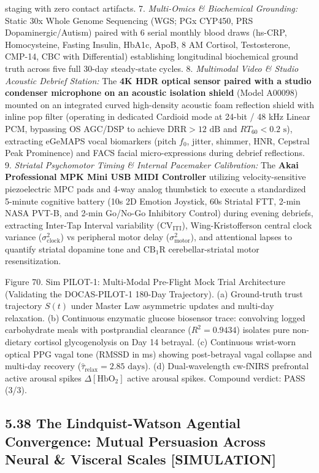 \documentclass[
]{article}
\begin{document}
staging with zero contact artifacts. 7. \emph{Multi-Omics \& Biochemical
Grounding:} Static 30x Whole Genome Sequencing (WGS; PGx CYP450, PRS
Dopaminergic/Autism) paired with 6 serial monthly blood draws (hs-CRP,
Homocysteine, Fasting Insulin, HbA1c, ApoB, 8 AM Cortisol, Testosterone,
CMP-14, CBC with Differential) establishing longitudinal biochemical
ground truth across five full 30-day steady-state cycles. 8.
\emph{Multimodal Video \& Studio Acoustic Debrief Station:} The
\textbf{4K HDR optical sensor paired with a studio condenser microphone
on an acoustic isolation shield} (Model A00098) mounted on an integrated
curved high-density acoustic foam reflection shield with inline pop
filter (operating in dedicated Cardioid mode at 24-bit / 48 kHz Linear
PCM, bypassing OS AGC/DSP to achieve \(\text{DRR} > 12\text{ dB}\) and
\(RT_{60} < 0.2\text{ s}\)), extracting eGeMAPS vocal biomarkers (pitch
\(f_0\), jitter, shimmer, HNR, Cepstral Peak Prominence) and FACS facial
micro-expressions during debrief reflections. 9. \emph{Striatal
Psychomotor Timing \& Internal Pacemaker Calibration:} The \textbf{Akai
Professional MPK Mini USB MIDI Controller} utilizing velocity-sensitive
piezoelectric MPC pads and 4-way analog thumbstick to execute a
standardized 5-minute cognitive battery (10s 2D Emotion Joystick, 60s
Striatal FTT, 2-min NASA PVT-B, and 2-min Go/No-Go Inhibitory Control)
during evening debriefs, extracting Inter-Tap Interval variability
(\(\text{CV}_{\text{ITI}}\)), Wing-Kristofferson central clock variance
(\(\sigma^2_{\text{clock}}\)) vs peripheral motor delay
(\(\sigma^2_{\text{motor}}\)), and attentional lapses to quantify
striatal dopamine tone and \(\mathrm{CB}_1\mathrm{R}\)
cerebellar-striatal motor resensitization.

Figure 70. Sim PILOT-1: Multi-Modal Pre-Flight Mock Trial Architecture
(Validating the DOCAS-PILOT-1 180-Day Trajectory). (a) Ground-truth
trust trajectory \(S(t)\) under Master Law asymmetric updates and
multi-day relaxation. (b) Continuous enzymatic glucose biosensor trace:
convolving logged carbohydrate meals with postprandial clearance
(\(R^2 = 0.9434\)) isolates pure non-dietary cortisol glycogenolysis on
Day 14 betrayal. (c) Continuous wrist-worn optical PPG vagal tone (RMSSD
in ms) showing post-betrayal vagal collapse and multi-day recovery
(\(\hat{\tau}_{\mathrm{relax}} = 2.85\text{ days}\)). (d)
Dual-wavelength cw-fNIRS prefrontal active arousal spikes
\(\Delta [\mathrm{HbO}_2]\) active arousal spikes. Compound verdict:
PASS (3/3).

\subsection{5.38 The Lindquist-Watson Agential Convergence: Mutual
Persuasion Across Neural \& Visceral Scales
{[}SIMULATION{]}}\label{the-lindquist-watson-agential-convergence-mutual-persuasion-across-neural-visceral-scales-simulation}
\end{document}
